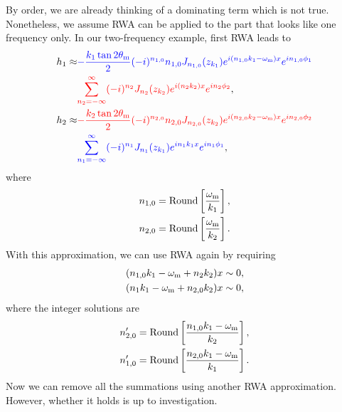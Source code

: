 By order, we are already thinking of a dominating term which is not true. Nonetheless, we assume RWA can be applied to the part that looks like one frequency only. In our two-frequency example, first RWA leads to
\begin{align}
   h_1  \approx & {\color{blue}-\frac{k_1 \tan 2\theta_\mm}{2} (-i)^{n_{1,0}} n_{1,0} J_{n_{1,0}} (z_{k_1}) e^{i (n_{1,0} k_1-\omega_\mm)x} e^{i n_{1,0}\phi_1} } \nonumber \\
   &{\color{red} \sum_{n_2=-\infty}^{\infty} (-i)^{n_2} J_{n_2}(z_{k_2}) e^{i(n_2k_2)x} e^{i n_2 \phi_2}  }, \\
   h_2  \approx & {\color{red} - \frac{k_2\tan 2\theta_\mm}{2} (-i)^{n_{2,0}} n_{2,0} J_{n_{2,0}}(z_{k_2}) e^{i(n_{2,0}k_2-\omega_\mm)x} e^{i n_{2,0} \phi_2}  } \nonumber \\
   &{\color{blue} \sum_{n_1=-\infty}^{\infty} (-i)^{n_1} J_{n_1}(z_{k_1}) e^{in_1 k_1 x} e^{i n_1 \phi_1} },
   \label{chap:matter-sec:jacobi-subsec:multi-matter-freq-eqn:eqn-after-first-rwa}
\end{align}
where
\begin{align}
   n_{1,0} &= \mathrm{Round}\left[  \frac{\omega_\mathrm m}{k_1}  \right], \\
   n_{2,0} &= \mathrm{Round}\left[  \frac{\omega_\mathrm m}{k_2}  \right] .
\end{align}
With this approximation, we can use RWA again by requiring
\begin{align}
   (n_{1,0} k_1-\omega_\mathrm m + n_2 k_2)x &\sim 0, \\
   (n_1 k_1-\omega_\mathrm m + n_{2,0} k_2)x &\sim 0,
\end{align}
where the integer solutions are
\begin{align}
   n'_{2,0} &= \mathrm{Round}\left[ \frac{ n_{1,0} k_1-\omega_\mathrm m }{k_2} \right], \\
   n'_{1,0} &= \mathrm{Round}\left[ \frac{ n_{2,0} k_1-\omega_\mathrm m }{k_1} \right].
\end{align}
Now we can remove all the summations using another RWA approximation. However, whether it holds is up to investigation.

